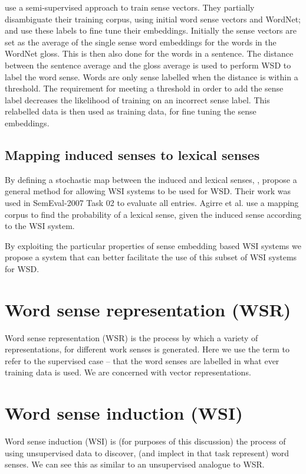 \documentclass[12pt,parskip]{komatufte}
\begin{document}
 use a semi-supervised approach to train sense vectors.
They partially disambiguate their training corpus, using initial word sense vectors and WordNet; and use these labels to fine tune their embeddings.
Initially the sense vectors are set as the average of the single sense word embeddings \parencite{mikolov2013efficient} for the words in the WordNet gloss.
This is then also done for the words in a sentence.
The distance between the sentence average and the gloss average is used to perform WSD to label the word sense. Words are only sense labelled when the distance is within a threshold.
The requirement for meeting a threshold in order to add the sense label  decreases the likelihood of training on an incorrect sense label.
This relabelled data is then used as training data, for fine tuning the sense embeddings.


\subsection{Mapping induced senses to lexical senses}\label{mapping}
By defining a stochastic map between the induced and lexical senses, , propose a general method for allowing WSI systems to be used for WSD.
Their work was used in SemEval-2007 Task 02 \parencite{SemEval2007WSIandWSD} to evaluate all entries. 
Agirre et al. use a mapping corpus to find the probability of a lexical sense, given the induced sense according to the WSI system.

By exploiting the particular properties of sense embedding based WSI systems we propose a system that can better facilitate the use of this subset of WSI systems for WSD.

\section{Word sense representation (WSR)}
Word sense representation (WSR) is the process by which a variety of representations, for different work senses is generated.
Here we use the term to refer to the supervised case -- that the word senses are labelled in what ever training data is used.
We are concerned with vector representations.


\section{Word sense induction (WSI)}
Word sense induction (WSI) is (for purposes of this discussion) the process of using unsupervised data to discover, (and implect in that task represent) word senses.
We can see this as similar to an unsupervised analogue to WSR.
\end{document}
